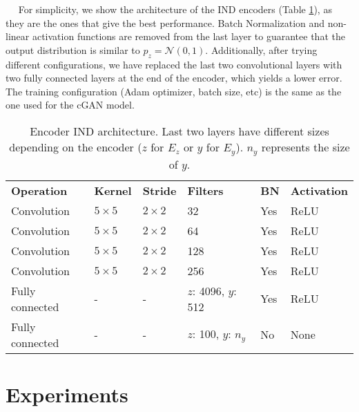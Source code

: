 \documentclass{article}
\newcommand{\minisection}[1]{\vspace{0.04in} \noindent {\bf #1}\ \ }
\begin{document}
\minisection{Encoder}
For simplicity, we show the architecture of the IND encoders (Table \ref{tab:enc_arch}), as they are the ones that give the best performance. Batch Normalization and non-linear activation functions are removed from the last layer to guarantee that the output distribution is similar to $p_z = \mathcal{N}(0,1)$. Additionally, after trying different configurations, we have replaced the last two convolutional layers with two fully connected layers at the end of the encoder, which yields a lower error. The training configuration (Adam optimizer, batch size, etc) is the same as the one used for the cGAN model.  

\begin{table}[ht]
\centering
\caption{Encoder IND architecture. Last two layers have different sizes depending on the encoder ($z$ for $E_z$ or $y$ for $E_y$). $n_y$ represents the size of $y$.} 
\label{tab:enc_arch}
\begin{adjustbox}{width=0.6\textwidth}
\begin{tabular}{llllll}
\textbf{Operation} & \textbf{Kernel} & \textbf{Stride} & \textbf{Filters} & \textbf{BN} & \textbf{Activation} \\
Convolution        & $5\times5$      & $2\times2$      & 32               & Yes         & ReLU                \\
Convolution        & $5\times5$      & $2\times2$      & 64              & Yes         & ReLU                \\
Convolution        & $5\times5$      & $2\times2$      & 128              & Yes         & ReLU                \\
Convolution        & $5\times5$      & $2\times2$      & 256              & Yes         & ReLU                \\
Fully connected    & -               & -               & $z$: 4096, $y$: 512           & Yes         & ReLU                \\
Fully connected    & -               & -               & $z$: 100, $y$: $\mathit{n_y}$                & No          & None      \\
\end{tabular}
\end{adjustbox}
\end{table} 
\section{Experiments} \label{sec:experiments}
\end{document}
